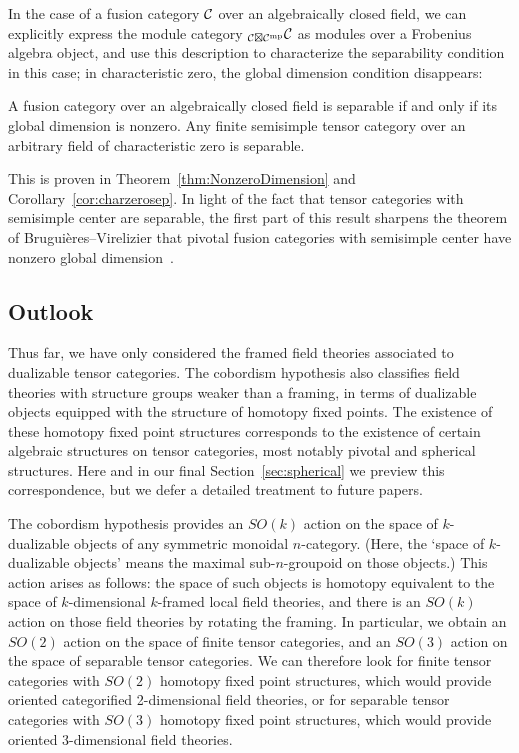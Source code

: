 \documentclass{amsart}
\begin{document}
In the case of a fusion category $\mathcal C$ over an algebraically closed field, we can explicitly express the module category ${}_{\mathcal C \boxtimes \mathcal C^{\mathrm{mp}}} \mathcal C$ as modules over a Frobenius algebra object, and use this description to characterize the separability condition in this case; in characteristic zero, the global dimension condition disappears:
\begin{maintheorem} \label{thm13}
A fusion category over an algebraically closed field is separable if and only if its global dimension is nonzero.  Any finite semisimple tensor category over an arbitrary field of characteristic zero is separable.
\end{maintheorem}
\nid This is proven in Theorem~\ref{thm:NonzeroDimension} and Corollary~\ref{cor:charzerosep}.  In light of the fact that tensor categories with semisimple center are separable, the first part of this result sharpens the theorem of Brugui\`eres--Virelizier that pivotal fusion categories with semisimple center have nonzero global dimension~\cite{MR3079759}.


\subsection{Outlook}

Thus far, we have only considered the framed field theories associated to dualizable tensor categories.  The cobordism hypothesis also classifies field theories with structure groups weaker than a framing, in terms of dualizable objects equipped with the structure of homotopy fixed points.  The existence of these homotopy fixed point structures corresponds to the existence of certain algebraic structures on tensor categories, most notably pivotal and spherical structures.  Here and in our final Section~\ref{sec:spherical} we preview this correspondence, but we defer a detailed treatment to future papers.

The cobordism hypothesis provides an $SO(k)$ action on the space of $k$-dualizable objects of any symmetric monoidal $n$-category.  (Here, the `space of $k$-dualizable objects' means the maximal sub-$n$-groupoid on those objects.)  This action arises as follows: the space of such objects is homotopy equivalent to the space of $k$-dimensional $k$-framed local field theories, and there is an $SO(k)$ action on those field theories by rotating the framing.  In particular, we obtain an $SO(2)$ action on the space of finite tensor categories, and an $SO(3)$ action on the space of separable tensor categories.  We can therefore look for finite tensor categories with $SO(2)$ homotopy fixed point structures, which would provide oriented categorified 2-dimensional field theories, or for separable tensor categories with $SO(3)$ homotopy fixed point structures, which would provide oriented 3-dimensional field theories.
\end{document}
